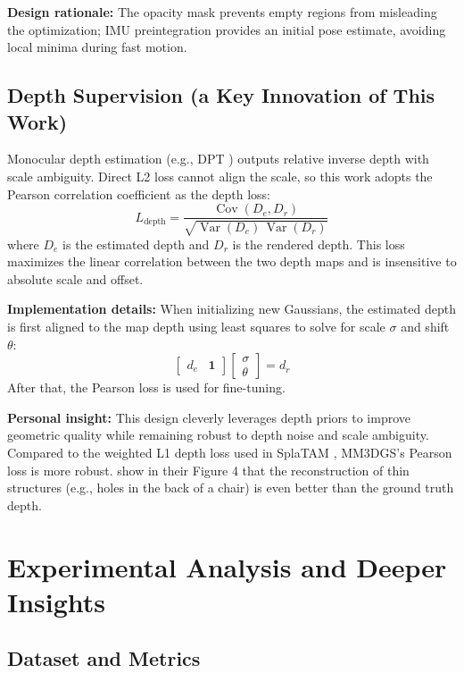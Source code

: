 \documentclass[12pt,a4paper,onecolumn]{article}
\begin{document}
\textbf{Design rationale:} The opacity mask prevents empty regions from misleading the optimization; IMU preintegration provides an initial pose estimate, avoiding local minima during fast motion.

\subsection{Depth Supervision (a Key Innovation of This Work)}

Monocular depth estimation (e.g., DPT \citep{DPT}) outputs relative inverse depth with scale ambiguity. Direct L2 loss cannot align the scale, so this work adopts the Pearson correlation coefficient as the depth loss:
\[
L_{\text{depth}} = \frac{\operatorname{Cov}(D_e, D_r)}{\sqrt{\operatorname{Var}(D_e)\,\operatorname{Var}(D_r)}}
\]
where $D_e$ is the estimated depth and $D_r$ is the rendered depth. This loss maximizes the linear correlation between the two depth maps and is insensitive to absolute scale and offset.

\textbf{Implementation details:} When initializing new Gaussians, the estimated depth is first aligned to the map depth using least squares to solve for scale $\sigma$ and shift $\theta$:
\[
\begin{bmatrix} d_e & \mathbf{1} \end{bmatrix} \begin{bmatrix} \sigma \\ \theta \end{bmatrix} = d_r
\]
After that, the Pearson loss is used for fine-tuning.

\textbf{Personal insight:} This design cleverly leverages depth priors to improve geometric quality while remaining robust to depth noise and scale ambiguity. Compared to the weighted L1 depth loss used in SplaTAM \citep{SplaTAM}, MM3DGS's Pearson loss is more robust. \citet{MM3DGS} show in their Figure 4 that the reconstruction of thin structures (e.g., holes in the back of a chair) is even better than the ground truth depth.

\section{Experimental Analysis and Deeper Insights}

\subsection{Dataset and Metrics}
\end{document}
